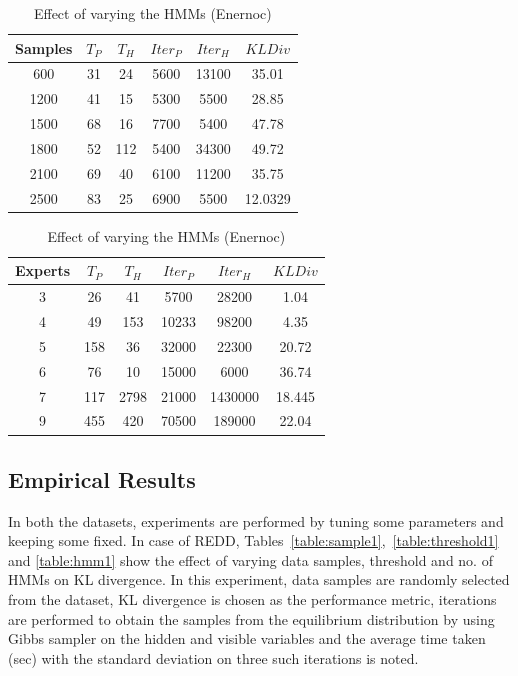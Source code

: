 \documentclass{acm_proc_article-sp}
\begin{document}
\begin{table}[htdp]
\parbox{.4\linewidth}{
\centering
\begin{tabular}{| c | c | c | c | c | c |}
\hline
Samples & $T_{P}$ & $T_H$ & $Iter_P$ & $Iter_H$ & $KL Div $\\
\hline
600 & 31 & 24 & 5600 & 13100 & 35.01 \\
1200 & 41 & 15 & 5300 & 5500 & 28.85 \\
1500 & 68 & 16 & 7700 & 5400 & 47.78  \\
1800 & 52 & 112 & 5400 & 34300 & 49.72 \\
2100 & 69 & 40 & 6100 & 11200 & 35.75 \\
2500 & 83 & 25 & 6900 & 5500 & 12.0329 \\
\hline
\end{tabular}
\caption{Effect of varying the samples (Enernoc)}
\label{table:sample3}}
\hfill
\parbox{.65\linewidth}{
\centering
\begin{tabular}{| c | c | c | c | c | c |}
\hline
Experts & $T_P$ & $T_H$ & $Iter_P$& $Iter_H$ & $KL Div $\\
\hline
3 & 26 & 41 & 5700 & 28200 & 1.04 \\
4 & 49 & 153 & 10233 & 98200 & 4.35 \\
5 & 158 & 36 & 32000 & 22300 & 20.72  \\
6 & 76 & 10 & 15000 & 6000 & 36.74 \\
7 & 117 & 2798 & 21000 & 1430000 & 18.445 \\
9 & 455 & 420 & 70500 & 189000 & 22.04  \\
\hline
\end{tabular}
\caption{Effect of varying the HMMs (Enernoc)}
\label{table:expert2}}
\end{table}



\subsection{Empirical Results}
In both the datasets, experiments are performed by tuning some parameters and keeping some fixed. In case of REDD, Tables~\ref{table:sample1},~\ref{table:threshold1} and \ref{table:hmm1} show the effect of varying data samples, threshold and no. of HMMs on KL divergence. In this experiment, data samples are randomly selected from the dataset, KL divergence is chosen as the performance metric, iterations are performed to obtain the samples from the equilibrium distribution by using Gibbs sampler on the hidden and visible variables and the average time taken (sec) with the standard deviation on three such iterations is noted.
\end{document}
